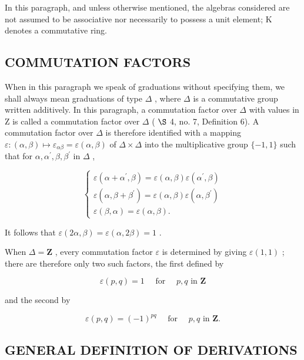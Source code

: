 In this paragraph, and unless otherwise mentioned, the algebras considered are not assumed to be associative nor necessarily to possess a unit element; K denotes a commutative ring.

\subsection{COMMUTATION FACTORS}

When in this paragraph we speak of graduations without specifying them, we shall always mean graduations of type \(\Delta\) , where \(\Delta\) is a commutative group written additively. In this paragraph, a commutation factor over \(\Delta\) with values in Z is called a commutation factor over \(\Delta\) ( \(\S\) 4, no. 7, Definition 6). A commutation factor over \(\Delta\) is therefore identified with a mapping \(\varepsilon\colon(\alpha,\beta)\mapsto\varepsilon_{\alpha\beta}=\varepsilon(\alpha,\beta)\) of \(\Delta\times\Delta\) into the multiplicative group \(\{-1,1\}\) such that for \(\alpha,\alpha^{\prime},\beta,\beta^{\prime}\) in \(\Delta\) ,

\[
\left\{ \begin{array}{l} \varepsilon (\alpha + \alpha^ {\prime}, \beta) = \varepsilon (\alpha , \beta) \varepsilon (\alpha^ {\prime}, \beta) \\ \varepsilon (\alpha , \beta + \beta^ {\prime}) = \varepsilon (\alpha , \beta) \varepsilon (\alpha , \beta^ {\prime}) \\ \varepsilon (\beta , \alpha) = \varepsilon (\alpha , \beta). \end{array} \right.\tag{1}
\]

It follows that \(\varepsilon(2\alpha, \beta) = \varepsilon(\alpha, 2\beta) = 1\) .

When \(\Delta = \mathbf{Z}\) , every commutation factor \(\varepsilon\) is determined by giving \(\varepsilon(1, 1)\) ; there are therefore only two such factors, the first defined by

\[
\varepsilon (p, q) = 1 \quad \text { for } \quad p, q \text { in } \mathbf {Z}\tag{2}
\]

and the second by

\[
\varepsilon (p, q) = (- 1) ^ {p q} \quad \text { for } \quad p, q \text { in } \mathbf {Z}.\tag{3}
\]

\subsection{GENERAL DEFINITION OF DERIVATIONS}

